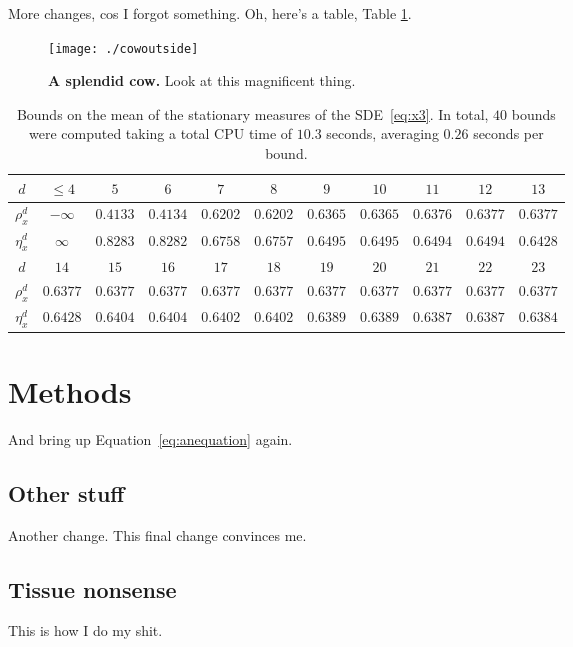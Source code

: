 \documentclass[a4paper,11pt,leqno]{article}
\numberwithin{equation}{section}
\begin{document}
More changes, cos I forgot something. Oh, here's a table, Table \ref{tab:table1}.

\begin{figure}
	\begin{center}
	\texttt{[image: ./cowoutside]}
	\vspace{-20pt}
	\end{center}
\caption{\textbf{A splendid cow.} Look at this magnificent thing.}
\label{fig:cow2}
\end{figure}

\begin{table}[!ht]
\begin{center}
\begin{tabular}{c|cc|cccccccc}%
$d$&$\leq4$&$5$&$6$&$7$&$8$&$9$&$10$&$11$&$12$&$13$\\     
\hline
$\rho_{x}^{d}$& $-\infty$   &  $0.4133$   &    $0.4134$  & $0.6202$ & $0.6202$   &$0.6365$    & $0.6365$   & $0.6376$ &$0.6377$&$0.6377$\\%
$\eta_{x}^d$  &$\infty$   & $0.8283$   & $0.8282$  &   $0.6758$   & $0.6757$    & $0.6495$ &  $0.6495$&  $0.6494$&$0.6494$&$0.6428$ \\\hline
$d$&$14$&$15$&$16$&$17$&$18$&$19$&$20$&$21$&$22$&$23$\\\hline
$\rho_{x}^{d}$&$0.6377$&$0.6377$&$0.6377$&$0.6377$&$0.6377$&$0.6377$&$0.6377$&$0.6377$&$0.6377$&$0.6377$ \\
$\eta_{x}^d$  &$0.6428$ &$0.6404$&$0.6404$ &$0.6402$&$0.6402$&$0.6389$&$0.6389$&$0.6387$&$0.6387$&$0.6384$\\
\end{tabular}%
\caption{Bounds on the mean of the stationary measures of the SDE~\eqref{eq:x3}. In total, $40$ bounds were computed taking a total CPU time of $10.3$ seconds, averaging $0.26$ seconds per bound.}
\label{tab:table1}
\end{center}
\end{table}

\section{Methods}

And bring up Equation~\eqref{eq:anequation} again. 


\subsection{Other stuff}

Another change. This final change convinces me.

\subsection{Tissue nonsense}\label{sec:tissuelabel}
This is how I do my shit.




\end{document}

